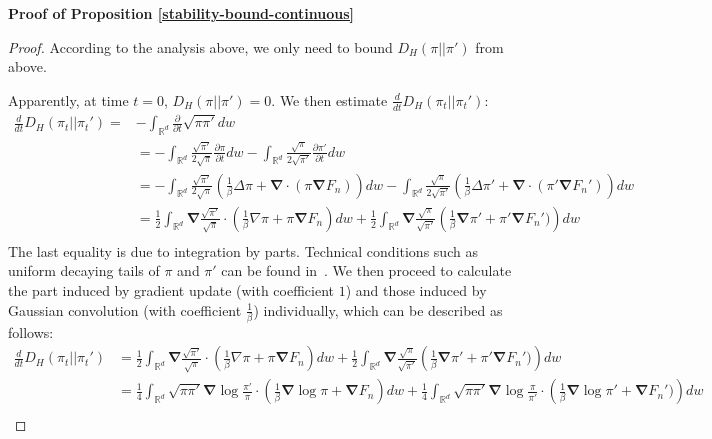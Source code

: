 \documentclass[final,12pt]{colt2018} %
\begin{document}
\noindent \textbf{Proof of Proposition \ref{stability-bound-continuous}}
\begin{proof}
According to the analysis above, we only need to bound $D_H(\pi||\pi')$ from above.

Apparently, at time $t=0$, $D_H(\pi||\pi')=0$. We then estimate $\frac{d}{dt}D_{H}(\pi_t||\pi_t')$:
\begin{equation}
\begin{split}
\frac{d}{dt}D_{H}(\pi_t||\pi_t')=&-\int_{\mathbb{R}^d} \frac{\partial }{\partial t}\sqrt{\pi \pi'}dw\\
&=-\int_{\mathbb{R}^d}\frac{\sqrt{\pi'}}{2\sqrt{\pi}}\frac{\partial \pi}{\partial t}dw-\int_{\mathbb{R}^d}\frac{\sqrt{\pi}}{2\sqrt{\pi'}}\frac{\partial \pi'}{\partial t}dw\\
&=-\int_{\mathbb{R}^d}\frac{\sqrt{\pi'}}{2\sqrt{\pi}}\left(\frac{1}{\beta}\Delta \pi+\bm{\nabla}\cdot(\pi \bm{\nabla}F_n)\right)dw-\int_{\mathbb{R}^d}\frac{\sqrt{\pi}}{2\sqrt{\pi'}}\left(\frac{1}{\beta}\Delta \pi'+\bm{\nabla}\cdot(\pi' \bm{\nabla}F_n')\right)dw\\
&=\frac{1}{2}\int_{\mathbb{R}^d}\bm{\nabla}\frac{\sqrt{\pi'}}{\sqrt{\pi}}\cdot\left(\frac{1}{\beta}\nabla\pi+\pi \bm{\nabla}F_n\right)dw+\frac{1}{2}\int_{\mathbb{R}^d}\bm{\nabla}\frac{\sqrt{\pi}}{\sqrt{\pi'}}\left(\frac{1}{\beta}\bm{\nabla}\pi'+\pi' \bm{\nabla}F_n')\right)dw\\
\end{split}
\end{equation}
The last equality is due to integration by parts. Technical conditions such as uniform decaying tails of $\pi$ and $\pi'$ can be found in~\citep{risken1996fokker}. We then proceed to calculate the part induced by gradient update (with coefficient $1$) and those induced by Gaussian convolution (with coefficient $\frac{1}{\beta}$) individually, which can be described as follows:
\begin{equation}
\begin{split}
\frac{d}{dt}D_{H}(\pi_t||\pi_t')&=\frac{1}{2}\int_{\mathbb{R}^d}\bm{\nabla}\frac{\sqrt{\pi'}}{\sqrt{\pi}}\cdot\left(\frac{1}{\beta}\nabla\pi+\pi \bm{\nabla}F_n\right)dw+\frac{1}{2}\int_{\mathbb{R}^d}\bm{\nabla}\frac{\sqrt{\pi}}{\sqrt{\pi'}}\left(\frac{1}{\beta}\bm{\nabla}\pi'+\pi' \bm{\nabla}F_n')\right)dw\\
&=\frac{1}{4}\int_{\mathbb{R}^d}\sqrt{\pi \pi'}\bm{\nabla}\log\frac{\pi'}{\pi}\cdot\left(\frac{1}{\beta}\bm{\nabla}\log\pi+ \bm{\nabla}F_n\right)dw+\frac{1}{4}\int_{\mathbb{R}^d}\sqrt{\pi \pi'}\bm{\nabla}\log\frac{\pi}{\pi'}\cdot\left(\frac{1}{\beta}\bm{\nabla}\log\pi'+\bm{\nabla}F_n')\right)dw\\

\end{split}
\end{equation}
\end{proof}
\end{document}
